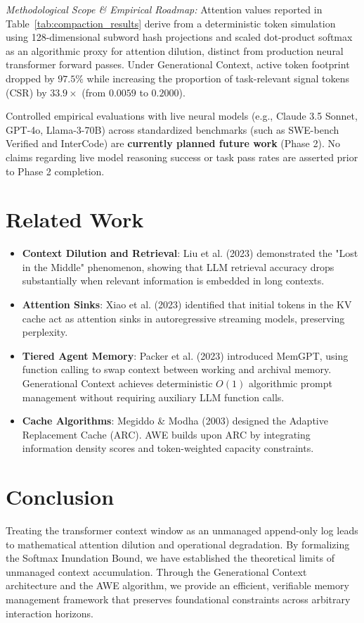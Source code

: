 \documentclass[11pt,a4paper]{article}
\begin{document}
\noindent\textit{Methodological Scope \& Empirical Roadmap:} 
Attention values reported in Table~\ref{tab:compaction_results} derive from a deterministic token simulation using 128-dimensional subword hash projections and scaled dot-product softmax as an algorithmic proxy for attention dilution, distinct from production neural transformer forward passes. Under Generational Context, active token footprint dropped by $97.5\%$ while increasing the proportion of task-relevant signal tokens (CSR) by $33.9\times$ (from $0.0059$ to $0.2000$).

Controlled empirical evaluations with live neural models (e.g., Claude 3.5 Sonnet, GPT-4o, Llama-3-70B) across standardized benchmarks (such as SWE-bench Verified and InterCode) are \textbf{currently planned future work} (Phase 2). No claims regarding live model reasoning success or task pass rates are asserted prior to Phase 2 completion.

\section{Related Work}
\label{sec:related_work}
\begin{itemize}
    \item \textbf{Context Dilution and Retrieval}: Liu et al. (2023) demonstrated the "Lost in the Middle" phenomenon, showing that LLM retrieval accuracy drops substantially when relevant information is embedded in long contexts.
    \item \textbf{Attention Sinks}: Xiao et al. (2023) identified that initial tokens in the KV cache act as attention sinks in autoregressive streaming models, preserving perplexity.
    \item \textbf{Tiered Agent Memory}: Packer et al. (2023) introduced MemGPT, using function calling to swap context between working and archival memory. Generational Context achieves deterministic $O(1)$ algorithmic prompt management without requiring auxiliary LLM function calls.
    \item \textbf{Cache Algorithms}: Megiddo \& Modha (2003) designed the Adaptive Replacement Cache (ARC). AWE builds upon ARC by integrating information density scores and token-weighted capacity constraints.
\end{itemize}

\section{Conclusion}
\label{sec:conclusion}
Treating the transformer context window as an unmanaged append-only log leads to mathematical attention dilution and operational degradation. By formalizing the Softmax Inundation Bound, we have established the theoretical limits of unmanaged context accumulation. Through the Generational Context architecture and the AWE algorithm, we provide an efficient, verifiable memory management framework that preserves foundational constraints across arbitrary interaction horizons.
\end{document}
